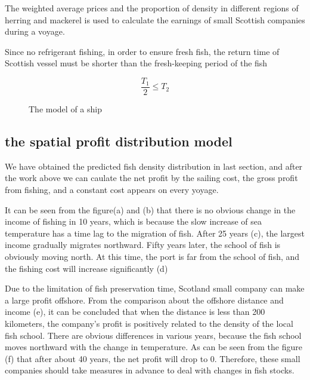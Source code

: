 \documentclass{mcmthesis}
\begin{document}
The weighted average prices and the proportion of density in different regions of herring and mackerel  is used to calculate the earnings of small Scottish companies during a voyage. 

Since no refrigerant fishing, in order to ensure fresh fish, the return time of Scottish vessel  must be shorter than the fresh-keeping period of the fish

\begin{equation}\label{10}
\frac{T_1}{2}\leq T_2
\end{equation}

\begin{figure}[tbp]
  \caption{The model of a ship}\label{figure1}
\end{figure}

\subsection{the spatial profit distribution model}
  We have obtained the predicted fish density distribution in last section, and after the work above we can caulate the net profit by the sailing cost, the gross profit from fishing, and a constant cost appears on every yoyage.
  
It can be seen from the figure(a) and (b) that there is no obvious change in the income of fishing in 10 years, which is because the slow increase of sea temperature has a time lag to the migration of fish. After 25 years (c), the largest income gradually migrates northward. Fifty years later, the school of fish is obviously moving north. At this time, the port is far from the school of fish, and the fishing cost will increase significantly (d)

Due to the limitation of fish preservation time,  Scotland small company can make a large profit offshore. From the comparison about the offshore distance and income (e), it can be concluded that when the distance is less than 200 kilometers, the company's profit is positively related to the density of the local fish school. There are obvious differences in various years, because the fish school moves northward with the change in temperature. As can be seen from the figure (f) that after about 40 years, the net profit will drop to 0. Therefore, these small companies should take measures in advance to deal with changes in fish stocks.
\end{document}
